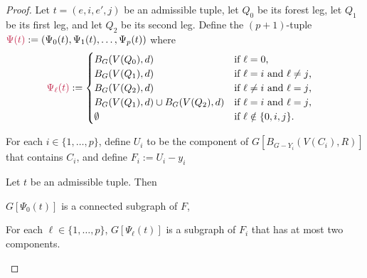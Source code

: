 \documentclass{patmorin}
\newcommand{\pat}[1]{\textcolor{Blue}{Pat: #1}}
\newcommand{\piotr}[1]{\textcolor{red}{Piotr: #1}}
\DeclareMathOperator{\thick}{th}
\begin{document}
\begin{proof}


Let $t=(e,i,e',j)$ be an admissible tuple, 
let $Q_0$ be its forest leg, 
let $Q_1$ be its first leg, and
let $Q_2$ be its second leg. 
Define the $(p+1)$-tuple $\mathdefin{\Psi(t)}:=(\Psi_0(t),\Psi_1(t),\ldots,\Psi_p(t))$ where
\begin{align*}
\mathdefin{\Psi_\ell(t)} &:=\begin{cases}
B_G(V(Q_0),d)&\textrm{if $\ell=0$,}\\
B_G(V(Q_1),d)&\textrm{if $\ell=i$ and $\ell\neq j$,}\\
B_G(V(Q_2),d)&\textrm{if $\ell\neq i$ and $\ell= j$,}\\
B_G(V(Q_1),d)\cup B_G(V(Q_2),d)&\textrm{if $\ell= i$ and $\ell= j$,}\\
\emptyset&\textrm{if $\ell\notin\{0,i,j\}$.}
\end{cases}
\end{align*}

For each $i\in\{1,\ldots,p\}$, define $U_i$ to be the component of $G[B_{G-Y_i}(V(C_i),R)]$ that contains $C_i$, and define $F_i:=U_i-y_i$

\begin{clm}
Let $t$ be an admissible tuple. Then 
\begin{compactenum}[(i)]
\item $G[\Psi_0(t)]$ is a connected subgraph of $F$,
\item For each $\ell\in\{1,\ldots,p\}$, $G[\Psi_\ell(t)]$ is a subgraph of $F_i$ that has at most two components.


\end{compactenum}
\end{clm}
\end{proof}
\end{document}
